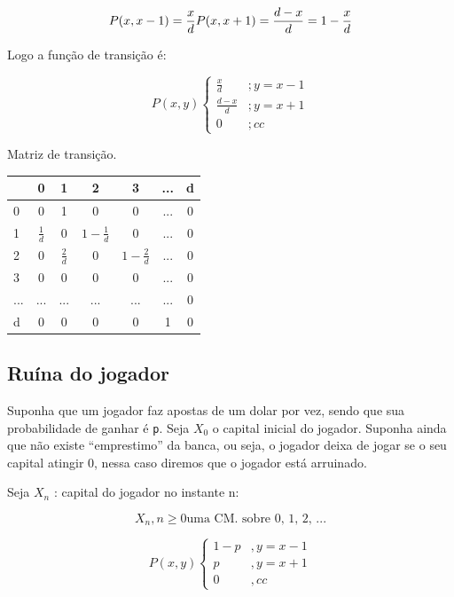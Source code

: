 \documentclass[]{article}
\theoremstyle{definition}
\theoremstyle{definition}
\theoremstyle{definition}
\theoremstyle{remark}
\begin{document}
\begin{equation}
P(x,x-1) = \frac{x}{d}\\
P(x,x+1) = \frac{d-x}{d} = 1 - \frac{x}{d}
\end{equation}

Logo a função de transição é:

\begin{equation}
P(x,y)\left\{\begin{matrix}
\frac{x}{d} &; y = x - 1 \\
\frac{d-x}{d} &; y = x+1\\
0 &; cc
\end{matrix}\right.
\end{equation}

Matriz de transição.

\begin{tabular}{l|c|c|c|c|c|c}
\hline
  & 0 & 1 & 2 & 3 & ... & d\\
\hline
0 & 0 & 1 & 0 & 0 & ... & 0\\
\hline
1 & $\frac{1}{d}$ & 0 & $1 - \frac{1}{d}$ & 0 & ... & 0\\
\hline
2 & 0 & $\frac{2}{d}$ & 0 & $1 - \frac{2}{d}$ & ... & 0\\
\hline
3 & 0 & 0 & 0 & 0 & ... & 0\\
\hline
... & ... & ... & ... & ... & ... & 0\\
\hline
d & 0 & 0 & 0 & 0 & 1 & 0\\
\hline
\end{tabular}

\subsection{Ruína do jogador}\label{ruina-do-jogador}

Suponha que um jogador faz apostas de um dolar por vez, sendo que sua
probabilidade de ganhar é \texttt{p}. Seja \(X_0\) o capital inicial do
jogador. Suponha ainda que não existe ``emprestimo'' da banca, ou seja,
o jogador deixa de jogar se o seu capital atingir 0, nessa caso diremos
que o jogador está arruinado.

Seja \(X_n\) : capital do jogador no instante n:

\[{X_n, n \geq 0} \text{uma CM. sobre {0, 1, 2, ...}}\]

\begin{equation}
P(x,y )\left\{\begin{matrix}
 1-p &, y = x -1\\
p  &, y = x + 1\\
0 &,  cc
\end{matrix}\right.
\end{equation}
\end{document}
